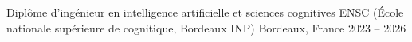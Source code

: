 
\begin{cventries}
  \cventry
    {Diplôme d’ingénieur en intelligence artificielle et sciences cognitives}
    {ENSC (École nationale supérieure de cognitique, Bordeaux INP)}
    {Bordeaux, France}
    {2023 -- 2026}
    {}
\end{cventries}
